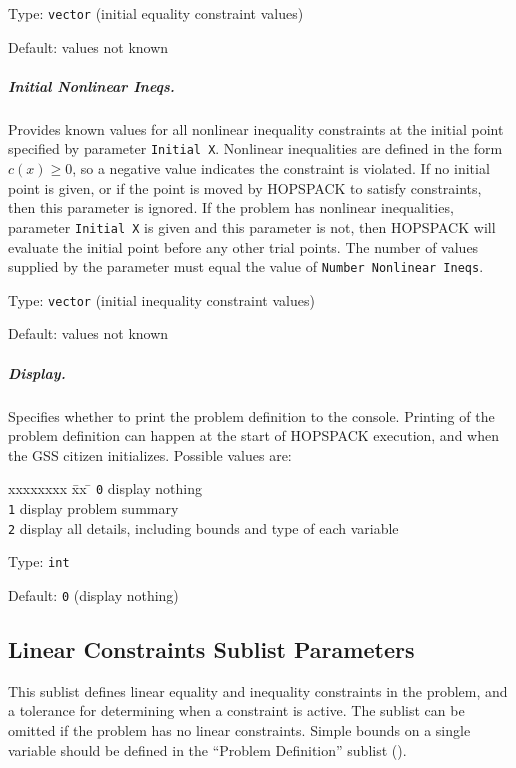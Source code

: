 \hspace{0.2in}
Type: {\tt vector} (initial equality constraint values)

\hspace{0.2in}
Default: values not known

\subparagraph{Initial Nonlinear Ineqs.}  \label{param:PD-initineqs}
Provides known values for all nonlinear inequality constraints at the initial
point specified by parameter {\tt Initial X}.
Nonlinear inequalities are defined in the form $c(x) \geq 0$, so a negative
value indicates the constraint is violated.
If no initial point is given,
or if the point is moved by HOPSPACK to satisfy constraints, then this parameter
is ignored.
If the problem has nonlinear inequalities, parameter {\tt Initial X} is given
and this parameter is not,
then HOPSPACK will evaluate the initial point before any other trial points.
The number of values supplied by the parameter must equal the value of
{\tt Number Nonlinear Ineqs}.

\hspace{0.2in}
Type: {\tt vector} (initial inequality constraint values)

\hspace{0.2in}
Default: values not known

\subparagraph{Display.}  \label{param:PD-display}
Specifies whether to print the problem definition to the console.
Printing of the problem definition can happen at the start of HOPSPACK execution,
and when the GSS citizen initializes.  Possible values are:
\begin{tabbing}
  xxxxxxxx \= xx \= \kill
     \> {\tt 0} \> display nothing \\
     \> {\tt 1} \> display problem summary  \\
     \> {\tt 2} \> display all details, including bounds and type of
                   each variable
\end{tabbing}

\hspace{0.2in}
Type: {\tt int}

\hspace{0.2in}
Default: {\tt 0} (display nothing)


\subsection{Linear Constraints Sublist Parameters}
\label{subconfig:LC}

This sublist defines linear equality and inequality constraints in the problem,
and a tolerance for determining when a constraint is active.
The sublist can be omitted if the problem has no linear constraints.
Simple bounds on a single variable should be defined in the
``Problem Definition'' sublist ().

